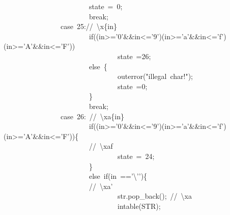 \documentclass{article}
\begin{document}
\begin{mdpre}
~~~~~~~~~~~~~~~~~~~~~~~~state~=~{0};\\
~~~~~~~~~~~~~~~~~~~~~~~~{break};\\
~~~~~~~~~~~~~~~~{case}~{25}://~\textbackslash{}x\{in\}\\
~~~~~~~~~~~~~~~~~~~~~~~~{if}((in\textgreater{}={'0'}\&\&in\textless{}={'9'})\textbar{}\textbar{}(in\textgreater{}={'a'}\&\&in\textless{}={'f'})\textbar{}\textbar{}(in\textgreater{}={'A'}\&\&in\textless{}={'F'}))\\
~~~~~~~~~~~~~~~~~~~~~~~~~~~~~~~~state~={26};\\
~~~~~~~~~~~~~~~~~~~~~~~~{else}~\{\\
~~~~~~~~~~~~~~~~~~~~~~~~~~~~~~~~outerror({"}{illegal~char!}{"});\\
~~~~~~~~~~~~~~~~~~~~~~~~~~~~~~~~state~={0};\\
~~~~~~~~~~~~~~~~~~~~~~~~\}\\
~~~~~~~~~~~~~~~~~~~~~~~~{break};\\
~~~~~~~~~~~~~~~~{case}~{26}:~{//~\textbackslash{}xa\{in\}}\\
~~~~~~~~~~~~~~~~~~~~~~~~{if}((in\textgreater{}={'0'}\&\&in\textless{}={'9'})\textbar{}\textbar{}(in\textgreater{}={'a'}\&\&in\textless{}={'f'})\textbar{}\textbar{}(in\textgreater{}={'A'}\&\&in\textless{}={'F'}))\{\\
~~~~~~~~~~~~~~~~~~~~~~~~{//~\textbackslash{}xaf}\\
~~~~~~~~~~~~~~~~~~~~~~~~~~~~~~~~state~=~{24};~~~\\
~~~~~~~~~~~~~~~~~~~~~~~~\}\\
~~~~~~~~~~~~~~~~~~~~~~~~{else}~{if}(in~=={'}{\textbackslash{}'}{'})\{\\
~~~~~~~~~~~~~~~~~~~~~~~~{//~\textbackslash{}xa'~~}\\
~~~~~~~~~~~~~~~~~~~~~~~~~~~~~~~~str.pop\_back();~{//~\textbackslash{}xa}\\
~~~~~~~~~~~~~~~~~~~~~~~~~~~~~~~~intable({STR});\\

\end{mdpre}
\end{document}
